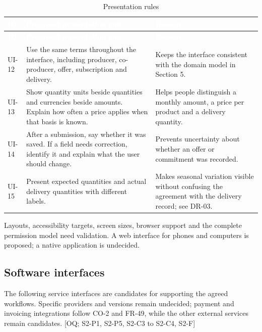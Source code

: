 \documentclass[11pt,a4paper]{article}
\begin{document}
{\footnotesize
\begin{longtable}{>{\raggedright\arraybackslash\hspace{0pt}}p{}>{\raggedright\arraybackslash\hspace{0pt}}p{}>{\raggedright\arraybackslash\hspace{0pt}}p{}}
\caption{Presentation rules}\\
\rowcolor{hdr}\textcolor{white}{\textbf{ID}} & \textcolor{white}{\textbf{Proposed presentation rule}} & \textcolor{white}{\textbf{Reason}} \\ \endfirsthead
\rowcolor{hdr}\textcolor{white}{\textbf{ID}} & \textcolor{white}{\textbf{Proposed presentation rule}} & \textcolor{white}{\textbf{Reason}} \\ \endhead
UI-12 & Use the same terms throughout the interface, including producer, co-producer, offer, subscription and delivery. & Keeps the interface consistent with the domain model in Section 5. \\ \hline
UI-13 & Show quantity units beside quantities and currencies beside amounts. Explain how often a price applies when that basis is known. & Helps people distinguish a monthly amount, a price per product and a delivery quantity. \\ \hline
UI-14 & After a submission, say whether it was saved. If a field needs correction, identify it and explain what the user should change. & Prevents uncertainty about whether an offer or commitment was recorded. \\ \hline
UI-15 & Present expected quantities and actual delivery quantities with different labels. & Makes seasonal variation visible without confusing the agreement with the delivery record; see DR-03. \\ \hline
\end{longtable}}
Layouts, accessibility targets, screen sizes, browser support and the complete permission model need validation. A web interface for phones and computers is proposed; a native application is undecided.


\subsection{Software interfaces}

The following service interfaces are candidates for supporting the agreed workflows. Specific providers and versions remain undecided; payment and invoicing integrations follow CO-2 and FR-49, while the other external services remain candidates. [OQ; S2-P1, S2-P5, S2-C3 to S2-C4, S2-F]
\end{document}
